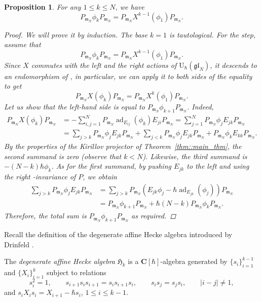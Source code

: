 \documentclass[pdftex]{sigma}
\numberwithin{equation}{section}
\newtheorem{Proposition}[Theorem]{Proposition}
{ \theoremstyle{definition}
	\newtheorem{Definition}[Theorem]{Definition}
	\newtheorem{Note}[Theorem]{Note}
	\newtheorem{Example}[Theorem]{Example}
	\newtheorem{Remark}[Theorem]{Remark} }
\newcommand{\C}{\mathbf{C}}
\newcommand{\U}{\mathrm{U}_{\hbar}}
\newcommand{\n}{\mathfrak{n}}
\newcommand{\m}{\mathfrak{m}}
\DeclareMathOperator{\ad}{ad}
\newcommand{\res}{\mathrm{res}}
\newcommand{\gl}{\mathfrak{gl}}
\begin{document}
	\begin{Proposition}
		\label{prop:canonical_homomorphism}
		For any $1\leq k \leq N$, we have
		\[
		P_{\m_N} \phi_k P_{\m_N} = P_{\m_N}X^{k-1} (\phi_1) P_{\m_N}.
		\]
		\begin{proof}
			We will prove it by induction. The base $k=1$ is tautological. For the step, assume that
			\[
			P_{\m_N} \phi_k P_{\m_N}= P_{\m_N} X^{k-1} (\phi_1) P_{\m_N}.
			\]
			Since $X$ commutes with the left and the right actions of $\U(\gl_N)$, it descends to an endomorphism of \smash{$\res^{\psi}_{\gl_N}(V \otimes \U(\gl_N))$}, in particular, we can apply it to both sides of the equality to get
			\[
			P_{\m_N} X(\phi_k) P_{\m_N} = P_{\m_N}X^k(\phi_1) P_{\m_N}.
			\]
			Let us show that the left-hand side is equal to $P_{\m_N}\phi_{k+1} P_{\m_N}$. Indeed,
			\begin{align*}
				P_{\m_N}X(\phi_k) P_{\m_N} &= -\sum_{i,j=1}^N P_{\m_N} \ad_{E_{ij}}(\phi_k) E_{ji} P_{\m_N} = \sum_{j=1}^N P_{\m_N} \phi_j E_{jk} P_{\m_N} \\
				&=\sum_{j>k} P_{\m_N} \phi_j E_{jk} P_{\m_N} + \sum_{j <k} P_{\m_N} \phi_j E_{jk} P_{\m_N} + P_{\m_N} \phi_k E_{kk} P_{\m_N}.
			\end{align*}
			By the properties of the Kirillov projector of Theorem~\ref{thm::main_thm}, the second summand is zero (observe that $k<N$). Likewise, the third summand is $-(N-k)\hbar \phi_k$. As for the first summand, by pushing $E_{jk}$ to the left and using the right \smash{$\n_-^{\psi}$}-invariance of $P$, we obtain
			\begin{align*}
			\sum_{j>k} P_{\m_N} \phi_j E_{jk} P_{\m_N} &= \sum_{j>k} P_{\m_N} (E_{jk}\phi_j - \hbar \ad_{E_{jk}}(\phi_j)) P_{\m_N}\\
& = P_{\m_N}\phi_{k+1} P_{\m_N} + \hbar (N-k) P_{\m_N}\phi_k P_{\m_N}.
			\end{align*}
			Therefore, the total sum is $P_{\m_N}\phi_{k+1}P_{\m_N}$ as required.
		\end{proof}
	\end{Proposition}
	
	Recall the definition of the degenerate affine Hecke algebra introduced by Drinfeld \cite{DrinfeldDaH}.
	
	\begin{Definition}
		The \emph{degenerate affine Hecke algebra} $\mathfrak{H}_k$ is a $\C[\hbar]$-algebra generated by $\{s_i\}_{i=1}^{k-1}$ and $\{X_i\}_{i=1}^k$ subject to relations
		\[
		s_i^2 = 1, \qquad s_{i+1} s_i s_{i+1} = s_i s_{i+1} s_i, \qquad s_i s_j = s_j s_i,\qquad |i-j| \neq 1,
		\]
		and
$
		s_i X_i s_i = X_{i+1} - \hbar s_i$, $ 1 \leq i \leq k-1$.
	\end{Definition}
	
\end{document}
